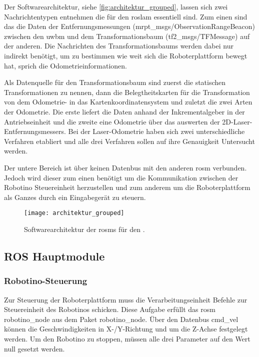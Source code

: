 Der Softwarearchitektur, siehe \autoref{fig:architektur_grouped}, lassen sich zwei Nachrichtentypen entnehmen die für den \gls{roslam} essentiell sind. Zum einen sind das die Daten der Entfernungsmessungen (mrpt\_msgs/ObservationRangeBeacon) zwischen den \gls{uwbm} und dem Transformationsbaum (tf2\_msgs/TFMessage) auf der anderen. Die Nachrichten des Transformationsbaums werden dabei nur indirekt benötigt, um zu bestimmen wie weit sich die Roboterplattform bewegt hat, sprich die Odometrieinformationen.

Als Datenquelle für den Transformationsbaum sind zuerst die statischen Transformationen zu nennen, dann die Belegtheitskarten für die Transformation von dem Odometrie- in das Kartenkoordinatensystem und zuletzt die zwei Arten der Odometrie. Die erste liefert die Daten anhand der Inkrementalgeber in der Antriebseinheit und die zweite eine Odometrie über das auswerten der 2D-Laser-Entfernungsmessers. Bei der Laser-Odometrie haben sich zwei unterschiedliche Verfahren etabliert und alle drei Verfahren sollen auf ihre Genauigkeit Untersucht werden.

Der untere Bereich ist über keinen Datenbus mit den anderen \gls{rosm} verbunden. Jedoch wird dieser zum einen benötigt um die Kommunikation zwischen der Robotino Steuereinheit herzustellen und zum anderem um die Roboterplattform als Ganzes durch ein Eingabegerät zu steuern.

\begin{figure}
	\centering
	\texttt{[image: architektur\_grouped]}
	\caption{Softwarearchitektur der \glspl{rosm} für den .}
	\label{fig:architektur_grouped}
\end{figure}


%
%
%
\subsection{ROS Hauptmodule}


%
%
\subsubsection{Robotino-Steuerung}

Zur Steuerung der Roboterplattform muss die Verarbeitungseinheit Befehle zur Steuereinheit des Robotinos schicken. Diese Aufgabe erfüllt das \Gls{rosm} robotino\_node aus dem Paket robotino\_node. Über den Datenbus cmd\_vel können die Geschwindigkeiten in X-/Y-Richtung und um die Z-Achse festgelegt werden. Um den Robotino zu stoppen, müssen alle drei Parameter auf den Wert null gesetzt werden.

